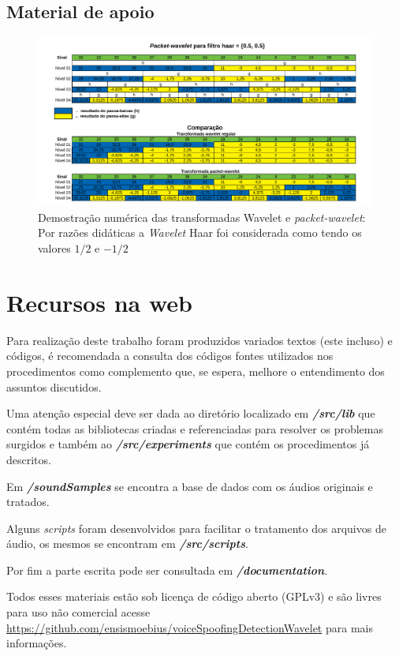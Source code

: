 \begin{apendicesenv}
	\partapendices
	\begin{landscape}
		\chapter{Material de apoio}
		\begin{figure}[h]
			\includegraphics[width=.93\linewidth]{images/haarWaveletExamples.pdf}
			\caption{Demostração numérica das transformadas Wavelet e \textit{packet-wavelet}: Por razões didáticas a \textit{Wavelet} Haar foi considerada como tendo os valores $1/2$ e $-1/2$}
			\label{fig:haarWaveletExamples}
		\end{figure}
	\end{landscape}
	\chapter{Recursos na web}
		\par Para realização deste trabalho foram produzidos variados textos (este incluso) e códigos, é recomendada a consulta dos códigos fontes utilizados nos procedimentos como complemento que, se espera, melhore o entendimento dos assuntos discutidos.
		
		\par Uma atenção especial deve ser dada ao diretório localizado em \textit{\textbf{/src/lib}} que contém todas as bibliotecas criadas e referenciadas para resolver os problemas surgidos e também ao \textit{\textbf{/src/experiments}} que contém os procedimentos já descritos.
				
		\par Em \textit{\textbf{/soundSamples}} se encontra a base de dados com os áudios originais e tratados.
		
		\par Alguns \textit{scripts} foram desenvolvidos para facilitar o tratamento dos arquivos de áudio, os mesmos se encontram em \textbf{\textit{/src/scripts}}.
		
		\par Por fim a parte escrita pode ser consultada em \textit{\textbf{/documentation}}.
		
		\par Todos esses materiais estão sob licença de código aberto (GPLv3) e são livres para uso não comercial acesse   \href{https://github.com/ensismoebius/voiceSpoofingDetectionWavelet}{https://github.com/ensismoebius/voiceSpoofingDetectionWavelet} para mais informações.
\end{apendicesenv}